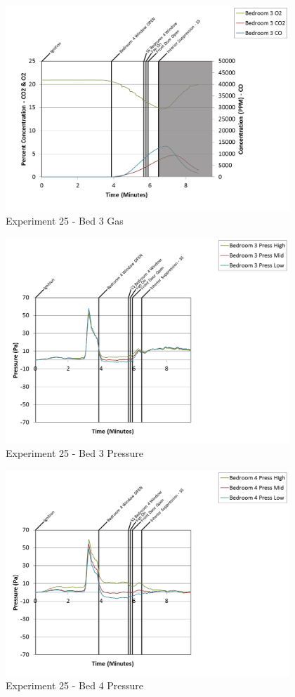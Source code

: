 \documentclass{article}
\begin{document}
\begin{appendices}
\clearpage

\begin{figure}[h!]
	\centering
	\includegraphics[height=3.05in]{0_Images/Results_Charts/Exp_25_Charts/Bed3Gas.png}
	\caption{Experiment 25 - Bed 3 Gas}
\end{figure}


\begin{figure}[h!]
	\centering
	\includegraphics[height=3.05in]{0_Images/Results_Charts/Exp_25_Charts/Bed3Pressure.png}
	\caption{Experiment 25 - Bed 3 Pressure}
\end{figure}

\clearpage

\begin{figure}[h!]
	\centering
	\includegraphics[height=3.05in]{0_Images/Results_Charts/Exp_25_Charts/Bed4Pressure.png}
	\caption{Experiment 25 - Bed 4 Pressure}
\end{figure}



\end{appendices}
\end{document}
